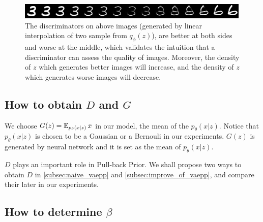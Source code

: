 \begin{figure}[tb]
	\centering
	\includegraphics[width=0.9\columnwidth]{../figures/interpolate}
	\caption{
	The discriminators on above images (generated by linear interpolation of two sample from $q_\phi(z)$), are better at both sides and worse at the middle, which validates the intuition that a discriminator can assess the quality of images. Moreover, the density of $z$ which generates better images will increase, and the density of $z$ which generates worse images will decrease. 
	}
	\label{fig:interpolate}
\end{figure}

\subsection{How to obtain $D$ and $G$}\label{subsec:determine_D_and_G}
We choose $G(z) = \operatorname{\mathbb{E}}_{p_\theta(x|z)} x$ in our model, \IE the mean of the $p_\theta(x|z)$. Notice that $p_\theta(x|z)$ is chosen to be a Gaussian or a Bernouli in our experiments. $G(z)$ is generated by neural network and it is set as the mean of $p_\theta(x|z)$. 

$D$ plays an important role in Pull-back Prior. We shall propose two ways to obtain $D$ in \cref{subsec:naive_vaepp} and \cref{subsec:improve_of_vaepp}, and compare their later in our experiments. 

\subsection{How to determine $\beta$}\label{subsec:determine_beta}

